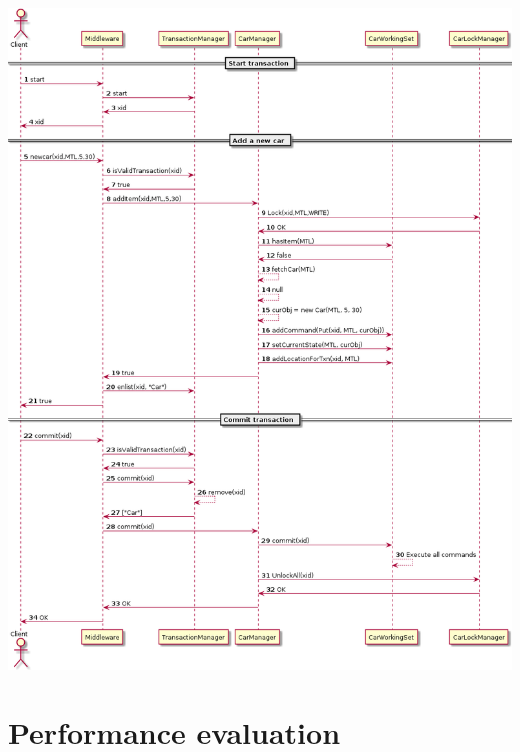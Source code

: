 \documentclass[10pt]{article}
\begin{document}
\begin{center}
\includegraphics[scale=0.4]{sequence_diagram.png}
\end{center}

\section{Performance evaluation}
\end{document}
